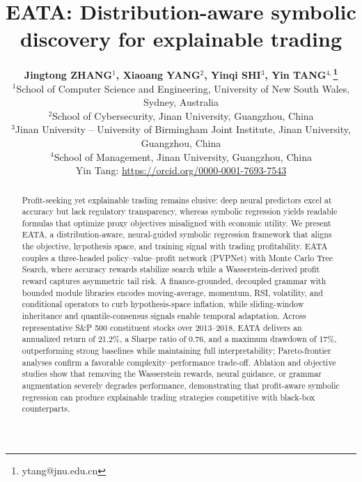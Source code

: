\documentclass{elektr}
\title{
EATA: Distribution-aware symbolic discovery for explainable trading
}
\author[Jingtong ZHANG and others]{
	\textbf{Jingtong ZHANG$^{1}$, Xiaoang YANG$^{2}$, Yinqi SHI$^{3}$, Yin TANG$^{4,}$\thanks{ytang@jnu.edu.cn}}\\
	$^{1}$School of Computer Science and Engineering, University of New South Wales, Sydney, Australia\\
	$^{2}$School of Cybersecurity, Jinan University, Guangzhou, China\\
	$^{3}$Jinan University -- University of Birmingham Joint Institute, Jinan University, Guangzhou, China\\
	$^{4}$School of Management, Jinan University, Guangzhou, China\\
	Yin Tang: \url{https://orcid.org/0000-0001-7693-7543} \\ [1.8em]

\rec{...}
\acc{...}
\finv{...}
}
\begin{document}
\maketitle

\begin{abstract}
Profit-seeking yet explainable trading remains elusive: deep neural predictors excel at accuracy but lack regulatory transparency, whereas symbolic regression yields readable formulas that optimize proxy objectives misaligned with economic utility. We present EATA, a distribution-aware, neural-guided symbolic regression framework that aligns the objective, hypothesis space, and training signal with trading profitability. EATA couples a three-headed policy--value--profit network (PVPNet) with Monte Carlo Tree Search, where accuracy rewards stabilize search while a Wasserstein-derived profit reward captures asymmetric tail risk. A finance-grounded, decoupled grammar with bounded module libraries encodes moving-average, momentum, RSI, volatility, and conditional operators to curb hypothesis-space inflation, while sliding-window inheritance and quantile-consensus signals enable temporal adaptation. Across representative S\&P 500 constituent stocks over 2013--2018, EATA delivers an annualized return of 21.2\%, a Sharpe ratio of 0.76, and a maximum drawdown of 17\%, outperforming strong baselines while maintaining full interpretability; Pareto-frontier analyses confirm a favorable complexity--performance trade-off. Ablation and objective studies show that removing the Wasserstein rewards, neural guidance, or grammar augmentation severely degrades performance, demonstrating that profit-aware symbolic regression can produce explainable trading strategies competitive with black-box counterparts.

\end{abstract}







\end{document}
